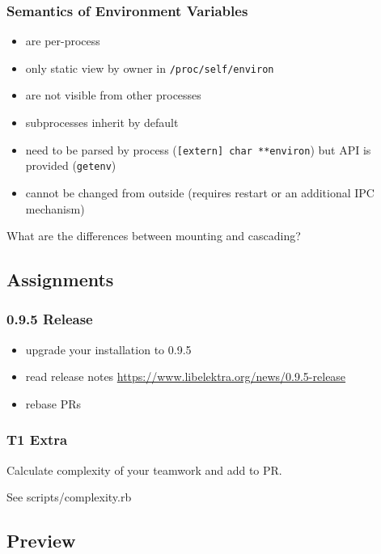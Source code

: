 \begin{frame}
	\frametitle{Semantics of Environment Variables}

	\pause
	\begin{itemize}
	\item are per-process
	\item only static view by owner in \texttt{/proc/self/environ}
	\item are not visible from other processes
	\item subprocesses inherit by default
	\item need to be parsed by process (\texttt{[extern] char **environ}) but API is provided (\texttt{getenv})
	\item cannot be changed from outside (requires restart or an additional IPC mechanism)
	\end{itemize}
\end{frame}

\begin{assignment}
	\begin{task}
	What are the differences between mounting and cascading?
	\end{task}
\end{assignment}

\subsection{Assignments}

\begin{frame}
	\frametitle{0.9.5 Release}

	\begin{itemize}[<+-| alert@+>]
	\item upgrade your installation to 0.9.5
	\item read release notes \url{https://www.libelektra.org/news/0.9.5-release}
	\item rebase PRs
	\end{itemize}
\end{frame}

\begin{assignment}
	\frametitle{T1 Extra}

	\begin{task}
	Calculate complexity of your teamwork and add to PR.
	\end{task}

	See scripts/complexity.rb
\end{assignment}


\subsection{Preview}

